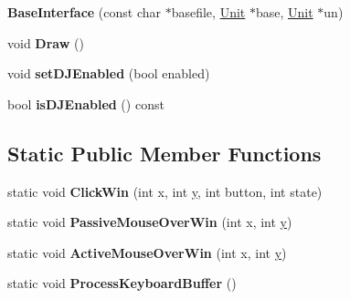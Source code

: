 \begin{DoxyCompactItemize}
\item 
{\bfseries Base\+Interface} (const char $\ast$basefile, \hyperlink{classUnit}{Unit} $\ast$base, \hyperlink{classUnit}{Unit} $\ast$un)\hypertarget{classBaseInterface_a6d36c9c516ea290b37e71f3539d58e93}{}\label{classBaseInterface_a6d36c9c516ea290b37e71f3539d58e93}

\item 
void {\bfseries Draw} ()\hypertarget{classBaseInterface_a14042b459721fc1b13e8fe56fce68976}{}\label{classBaseInterface_a14042b459721fc1b13e8fe56fce68976}

\item 
void {\bfseries set\+D\+J\+Enabled} (bool enabled)\hypertarget{classBaseInterface_a42eb58c9f0405d900ffaa8519de15ad2}{}\label{classBaseInterface_a42eb58c9f0405d900ffaa8519de15ad2}

\item 
bool {\bfseries is\+D\+J\+Enabled} () const \hypertarget{classBaseInterface_a156021313f6bc4477c0be1c1d50d3664}{}\label{classBaseInterface_a156021313f6bc4477c0be1c1d50d3664}

\end{DoxyCompactItemize}
\subsection*{Static Public Member Functions}
\begin{DoxyCompactItemize}
\item 
static void {\bfseries Click\+Win} (int x, int \hyperlink{IceUtils_8h_aa7ffaed69623192258fb8679569ff9ba}{y}, int button, int state)\hypertarget{classBaseInterface_a19324b59032393f85ae6ab5da22dc5fc}{}\label{classBaseInterface_a19324b59032393f85ae6ab5da22dc5fc}

\item 
static void {\bfseries Passive\+Mouse\+Over\+Win} (int x, int \hyperlink{IceUtils_8h_aa7ffaed69623192258fb8679569ff9ba}{y})\hypertarget{classBaseInterface_a5b06f27913f0c5264d093e225d524213}{}\label{classBaseInterface_a5b06f27913f0c5264d093e225d524213}

\item 
static void {\bfseries Active\+Mouse\+Over\+Win} (int x, int \hyperlink{IceUtils_8h_aa7ffaed69623192258fb8679569ff9ba}{y})\hypertarget{classBaseInterface_adeab0c898b07e108a382d9f310e058c6}{}\label{classBaseInterface_adeab0c898b07e108a382d9f310e058c6}

\item 
static void {\bfseries Process\+Keyboard\+Buffer} ()\hypertarget{classBaseInterface_a89548dd65819dfae05706ea542f8ffc5}{}\label{classBaseInterface_a89548dd65819dfae05706ea542f8ffc5}

\end{DoxyCompactItemize}
